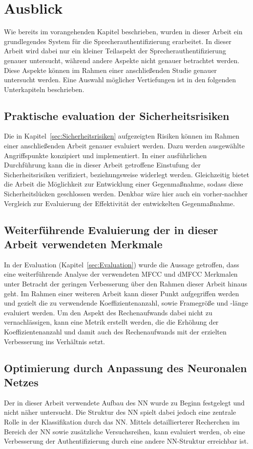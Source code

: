 \section{Ausblick}\label{sec:Ausblick}
Wie bereits im vorangehenden Kapitel beschrieben, wurden in dieser Arbeit ein grundlegendes System für die Sprecherauthentifizierung erarbeitet.
In dieser Arbeit wird dabei nur ein kleiner Teilaspekt der Sprecherauthentifizierung genauer untersucht, während andere Aspekte nicht genauer betrachtet werden.
Diese Aspekte können im Rahmen einer anschließenden Studie genauer untersucht werden.
Eine Auswahl möglicher Vertiefungen ist in den folgenden Unterkapiteln beschrieben.

\subsection{Praktische evaluation der Sicherheitsrisiken}
Die in Kapitel~\ref{sec:Sicherheitsrisiken} aufgezeigten Risiken können im Rahmen einer anschließenden Arbeit genauer evaluiert werden.
Dazu werden ausgewählte Angriffspunkte konzipiert und implementiert.
In einer ausführlichen Durchführung kann die in dieser Arbeit getroffene Einstufung der Sicherheitsrisiken verifiziert, beziehungsweise widerlegt werden.
Gleichzeitig bietet die Arbeit die Möglichkeit zur Entwicklung einer Gegenmaßnahme, sodass diese Sicherheitslücken geschlossen werden.
Denkbar wäre hier auch ein vorher-nachher Vergleich zur Evaluierung der Effektivität der entwickelten Gegenmaßnahme.

\subsection{Weiterführende Evaluierung der in dieser Arbeit verwendeten Merkmale}
In der Evaluation (Kapitel~\ref{sec:Evaluation}) wurde die Aussage getroffen, dass eine weiterführende Analyse der verwendeten \ac{MFCC} und \ac{dMFCC} Merkmalen unter Betracht der geringen Verbesserung über den Rahmen dieser Arbeit hinaus geht.
Im Rahmen einer weiteren Arbeit kann dieser Punkt aufgegriffen werden und gezielt die zu verwendende Koeffizientenanzahl, sowie Framegröße und -länge evaluiert werden.
Um den Aspekt des Rechenaufwands dabei nicht zu vernachlässigen, kann eine Metrik erstellt werden, die die Erhöhung der Koeffizientenanzahl und damit auch des Rechenaufwands mit der erzielten Verbesserung ins Verhältnis setzt.

\subsection{Optimierung durch Anpassung des Neuronalen Netzes}
Der in dieser Arbeit verwendete Aufbau des \ac{NN} wurde zu Beginn festgelegt und nicht näher untersucht.
Die Struktur des \ac{NN} spielt dabei jedoch eine zentrale Rolle in der Klassifikation durch das \ac{NN}.
Mittels detaillierterer Recherchen im Bereich der \ac{NN} sowie zusätzliche Versuchsreihen, kann evaluiert werden, ob eine Verbesserung der Authentifizierung durch eine andere \ac{NN}-Struktur erreichbar ist.

